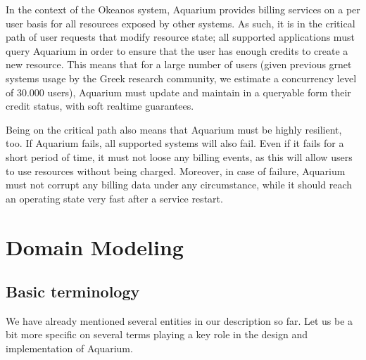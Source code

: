 \documentclass[preprint,10pt]{sigplanconf}
\begin{document}
In the context of the Okeanos system, Aquarium provides billing services on a
per user basis for all resources exposed by other systems. As such, it is in
the critical path of user requests that modify resource state; all supported
applications must query Aquarium in order to ensure that the user has enough
credits to create a new resource. This means that for a large number of users
(given previous {\sc grnet} systems usage by the Greek research community, we
estimate a concurrency level of 30.000 users), Aquarium must update and
maintain in a queryable form their credit status, with soft realtime
guarantees. 

Being on the critical path also means that Aquarium must be highly resilient,
too. If Aquarium fails, all supported systems will also fail. Even if it
fails for a short period of time, it must not loose any billing events, as this
will allow users to use resources without being charged. Moreover, in case of
failure, Aquarium must not corrupt any billing data under any circumstance,
while it should reach an operating state very fast after a service restart.

\section{Domain Modeling}

\subsection{Basic terminology}
We have already mentioned several entities in our description so far. Let us be a bit more specific on several terms playing a key role in the design and implementation of Aquarium.
\end{document}
